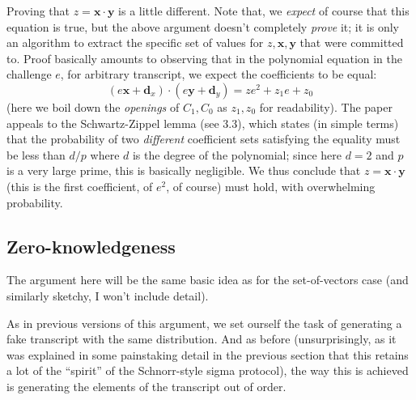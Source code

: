 \documentclass[10pt,a4paper]{article}
\begin{document}
Proving that $z = \mathbf{x}\cdot\mathbf{y}$ is a little different. Note that, we \emph{expect} of
course that this equation is true, but the above argument doesn't
completely \emph{prove} it; it is only an algorithm to extract the
specific set of values for $z, \mathbf{x}, \mathbf{y}$ that were committed to. Proof basically amounts to observing that
in the polynomial equation in the challenge $e$, for arbitrary
transcript, we expect the coefficients to be equal:
\[(e\textbf{x} + \textbf{d}_x) \cdot (e\textbf{y} + \textbf{d}_y) = z e^2 +  z_1 e + z_0\]
(here we boil down the \emph{openings }of $C_1, C_0$ as $z_1, z_0$ for readability). The paper
appeals to the Schwartz-Zippel lemma (see 3.3), which states (in simple
terms) that the probability of two \emph{different} coefficient sets
satisfying the equality must be less than $d/p$ where $d$ is the degree of the
polynomial; since here $d=2$ and $p$ is a very large prime, this is basically
negligible. We thus conclude that $z=\mathbf{x}\cdot \mathbf{y}$ (this is the first coefficient, of $e^2$,
of course) must hold, with overwhelming probability.

\hypertarget{zero-knowledgeness}{%
\subsection[Zero-knowledgeness]{\texorpdfstring{\protect\hypertarget{anchor-40}{}{}Zero-knowledgeness}{Zero-knowledgeness}}\label{zero-knowledgeness}}

The argument here will be the same basic idea as for the set-of-vectors
case (and similarly sketchy, I won't include detail).

As in previous versions of this argument, we set ourself the task of
generating a fake transcript with the same distribution. And as before
(unsurprisingly, as it was explained in some painstaking detail in the
previous section that this retains a lot of the ``spirit'' of the
Schnorr-style sigma protocol), the way this is achieved is generating
the elements of the transcript out of order.
\end{document}
